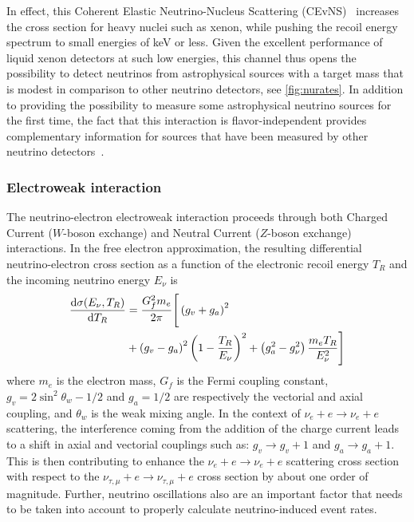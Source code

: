 In effect, this Coherent Elastic Neutrino-Nucleus Scattering (CEvNS)~\cite{Akimov:2017ade} increases the cross section for heavy nuclei such as xenon, while pushing the recoil energy spectrum to small energies of keV or less. Given the excellent performance of liquid xenon detectors at such low energies, this channel thus opens the possibility to detect neutrinos from astrophysical sources with a target mass that is modest in comparison to other neutrino detectors, see \autoref{fig:nurates}. In addition to providing the possibility to measure some astrophysical neutrino sources for the first time, the fact that this interaction is flavor-independent provides complementary information for sources that have been measured by other neutrino detectors~\cite{Cabrera:1984rr,Krauss:1985pf}.

\subsubsection{Electroweak interaction}\label{sec:ewinteraction}

The neutrino-electron electroweak interaction proceeds through both Charged Current ($W$-boson exchange) and Neutral Current ($Z$-boson exchange) interactions. In the free electron approximation, the resulting differential neutrino-electron cross section as a function of the electronic recoil energy $T_R$ and the incoming neutrino energy $E_\nu$ is
\begin{align*}
\frac{{\rm d}\sigma(E_\nu, T_R)}{{\rm d}T_R} & = \frac{G^2_f m_e}{2 \pi} \Bigg[ \Bigg. \left( g_v + g_a \right)^2 \\
 & + \left( g_v - g_a \right)^2 \left(1 - \frac{T_R}{E_{\nu}}\right)^2 + \left(g_{a}^{2} - g_{\nu}^{2} \right) \frac{m_e T_R}{E_{\nu}^2}\Bigg. \Bigg]
\end{align*}
where $m_e$ is the electron mass, $G_f$ is the Fermi coupling constant, $g_v = 2\sin^2{\theta_w} - 1/2$ and $g_a = 1/2$ are respectively the vectorial and axial coupling, and $\theta_w$ is the weak mixing angle. In the context of $\nu_e + e \rightarrow \nu_e + e$ scattering, the interference coming from the addition of the charge current leads to a shift in axial and vectorial couplings such as: $g_v \rightarrow g_v +1$ and  $g_a \rightarrow g_a +1$. This is then contributing to enhance the $\nu_e + e \rightarrow \nu_e + e$ scattering cross section with respect to the $\nu_{\tau, \mu} + e \rightarrow \nu_{\tau, \mu} + e$ cross section by about one order of magnitude. Further, neutrino oscillations also are an important factor that needs to be taken into account to properly calculate neutrino-induced event rates.

